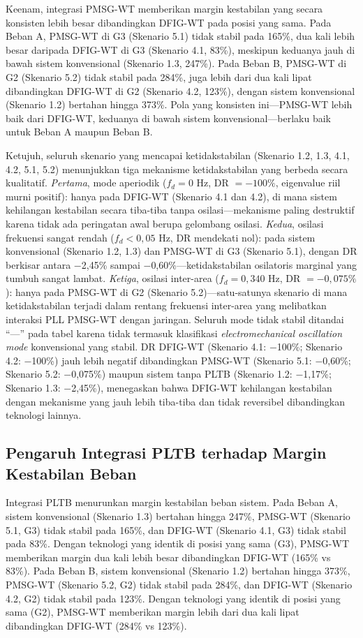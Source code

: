 Keenam, integrasi PMSG-WT memberikan margin kestabilan yang secara konsisten
lebih besar dibandingkan DFIG-WT pada posisi yang sama. Pada Beban A, PMSG-WT
di G3 (Skenario 5.1) tidak stabil pada 165\%, dua kali lebih besar daripada
DFIG-WT di G3 (Skenario 4.1, 83\%), meskipun keduanya jauh di bawah sistem
konvensional (Skenario 1.3, 247\%). Pada Beban B, PMSG-WT di G2 (Skenario 5.2)
tidak stabil pada 284\%, juga lebih dari dua kali lipat dibandingkan DFIG-WT
di G2 (Skenario 4.2, 123\%), dengan sistem konvensional (Skenario 1.2) bertahan
hingga 373\%. Pola yang konsisten ini---PMSG-WT lebih baik dari DFIG-WT, keduanya
di bawah sistem konvensional---berlaku baik untuk Beban A maupun Beban B.

Ketujuh, seluruh skenario yang mencapai ketidakstabilan (Skenario 1.2, 1.3,
4.1, 4.2, 5.1, 5.2) menunjukkan tiga mekanisme ketidakstabilan yang berbeda
secara kualitatif. \textit{Pertama}, mode aperiodik ($f_d = 0$ Hz, DR $= -100\%$,
eigenvalue riil murni positif): hanya pada DFIG-WT (Skenario 4.1 dan 4.2),
di mana sistem kehilangan kestabilan secara tiba-tiba tanpa osilasi---mekanisme
paling destruktif karena tidak ada peringatan awal berupa gelombang osilasi.
\textit{Kedua}, osilasi frekuensi sangat rendah ($f_d < 0{,}05$ Hz, DR mendekati
nol): pada sistem konvensional (Skenario 1.2, 1.3) dan PMSG-WT di G3 (Skenario
5.1), dengan DR berkisar antara $-$2,45\% sampai $-$0,60\%---ketidakstabilan
osilatoris marginal yang tumbuh sangat lambat. \textit{Ketiga}, osilasi inter-area
($f_d = 0{,}340$ Hz, DR $= -0{,}075\%$): hanya pada PMSG-WT di G2 (Skenario
5.2)---satu-satunya skenario di mana ketidakstabilan terjadi dalam rentang
frekuensi inter-area yang melibatkan interaksi PLL PMSG-WT dengan jaringan.
Seluruh mode tidak stabil ditandai ``---'' pada tabel karena tidak termasuk
klasifikasi \textit{electromechanical oscillation mode} konvensional yang stabil.
DR DFIG-WT (Skenario 4.1: $-$100\%; Skenario 4.2: $-$100\%) jauh lebih negatif
dibandingkan PMSG-WT (Skenario 5.1: $-$0,60\%; Skenario 5.2: $-$0,075\%)
maupun sistem tanpa PLTB (Skenario 1.2: $-$1,17\%; Skenario 1.3: $-$2,45\%),
menegaskan bahwa DFIG-WT kehilangan kestabilan dengan mekanisme yang jauh lebih
tiba-tiba dan tidak reversibel dibandingkan teknologi lainnya.

\subsection{Pengaruh Integrasi PLTB terhadap Margin Kestabilan Beban}

Integrasi PLTB menurunkan margin kestabilan beban sistem. Pada Beban A,
sistem konvensional (Skenario 1.3) bertahan hingga 247\%, PMSG-WT (Skenario
5.1, G3) tidak stabil pada 165\%, dan DFIG-WT (Skenario 4.1, G3) tidak stabil
pada 83\%. Dengan teknologi yang identik di posisi yang sama (G3), PMSG-WT
memberikan margin dua kali lebih besar dibandingkan DFIG-WT (165\% vs 83\%).
Pada Beban B, sistem konvensional (Skenario 1.2) bertahan hingga 373\%,
PMSG-WT (Skenario 5.2, G2) tidak stabil pada 284\%, dan DFIG-WT (Skenario 4.2,
G2) tidak stabil pada 123\%. Dengan teknologi yang identik di posisi yang sama
(G2), PMSG-WT memberikan margin lebih dari dua kali lipat dibandingkan DFIG-WT
(284\% vs 123\%).

